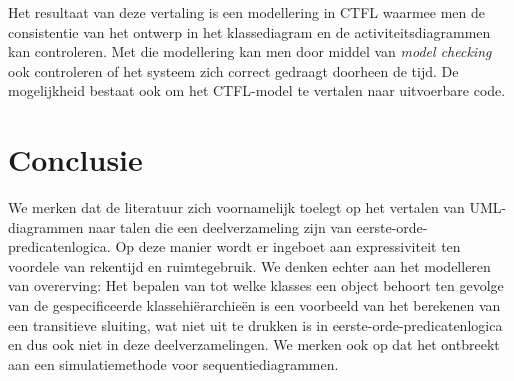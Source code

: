 Het resultaat van deze vertaling is een modellering in CTFL waarmee men de consistentie van het ontwerp in het klassediagram en de activiteitsdiagrammen kan controleren. Met die modellering kan men door middel van \textit{model checking} ook controleren of het systeem zich correct gedraagt doorheen de tijd. De mogelijkheid bestaat ook om het CTFL-model te vertalen naar uitvoerbare code.

\section{Conclusie}

We merken dat de literatuur zich voornamelijk toelegt op het vertalen van UML-diagrammen naar talen die een deelverzameling zijn van eerste-orde-predicatenlogica. Op deze manier wordt er ingeboet aan expressiviteit ten voordele van rekentijd en ruimtegebruik. We denken echter aan het modelleren van overerving: Het bepalen van tot welke klasses een object behoort ten gevolge van de gespecificeerde klassehi\"erarchie\"en is een voorbeeld van het berekenen van een transitieve sluiting, wat niet uit te drukken is in eerste-orde-predicatenlogica en dus ook niet in deze deelverzamelingen. We merken ook op dat het ontbreekt aan een simulatiemethode voor sequentiediagrammen.